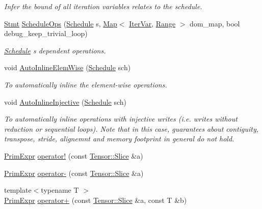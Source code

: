 \begin{DoxyCompactItemize}
\begin{DoxyCompactList}\small\item\em Infer the bound of all iteration variables relates to the schedule. \end{DoxyCompactList}\item 
\hyperlink{classtvm_1_1tir_1_1Stmt}{Stmt} \hyperlink{namespacetvm_1_1te_ac5f0fdd7c2d3deb15b7855c5b1ff1aff}{Schedule\+Ops} (\hyperlink{classtvm_1_1te_1_1Schedule}{Schedule} s, \hyperlink{classtvm_1_1Map}{Map}$<$ \hyperlink{classtvm_1_1tir_1_1IterVar}{Iter\+Var}, \hyperlink{classtvm_1_1Range}{Range} $>$ dom\+\_\+map, bool debug\+\_\+keep\+\_\+trivial\+\_\+loop)
\begin{DoxyCompactList}\small\item\em \hyperlink{classtvm_1_1te_1_1Schedule}{Schedule} s\textquotesingle{} dependent operations. \end{DoxyCompactList}\item 
void \hyperlink{namespacetvm_1_1te_a26ae0c9351036d0f7ca362e3c857d24a}{Auto\+Inline\+Elem\+Wise} (\hyperlink{classtvm_1_1te_1_1Schedule}{Schedule} sch)
\begin{DoxyCompactList}\small\item\em To automatically inline the element-\/wise operations. \end{DoxyCompactList}\item 
void \hyperlink{namespacetvm_1_1te_a9872626811f38606b4e934faa13b5b9f}{Auto\+Inline\+Injective} (\hyperlink{classtvm_1_1te_1_1Schedule}{Schedule} sch)
\begin{DoxyCompactList}\small\item\em To automatically inline operations with injective writes (i.\+e. writes without reduction or sequential loops). Note that in this case, guarantees about contiguity, transpose, stride, alignemnt and memory footprint in general do not hold. \end{DoxyCompactList}\item 
\hyperlink{classtvm_1_1PrimExpr}{Prim\+Expr} \hyperlink{namespacetvm_1_1te_a27eae569b04a2d43a513b654b6d2b98c}{operator!} (const \hyperlink{classtvm_1_1te_1_1Tensor_1_1Slice}{Tensor\+::\+Slice} \&a)
\item 
\hyperlink{classtvm_1_1PrimExpr}{Prim\+Expr} \hyperlink{namespacetvm_1_1te_a7cbaaf91ad0e43d83d88a522fcb4214b}{operator-\/} (const \hyperlink{classtvm_1_1te_1_1Tensor_1_1Slice}{Tensor\+::\+Slice} \&a)
\item 
{\footnotesize template$<$typename T $>$ }\\\hyperlink{classtvm_1_1PrimExpr}{Prim\+Expr} \hyperlink{namespacetvm_1_1te_a8aa8fb334a26e4b8e8ab3d66454187a7}{operator+} (const \hyperlink{classtvm_1_1te_1_1Tensor_1_1Slice}{Tensor\+::\+Slice} \&a, const T \&b)

\end{DoxyCompactItemize}
